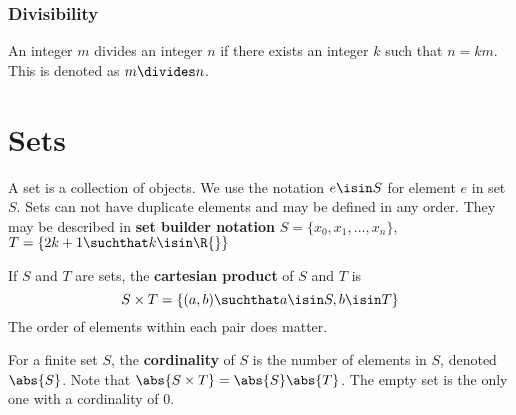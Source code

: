 \documentclass[12pt]{article}
\begin{document}


\subsubsection*{Divisibility}
 An integer $m$ divides an integer $n$ if there exists an integer $k$ such that $n = km$. This is denoted as $m \divides n$.



\section*{Sets}
A set is a collection of objects. We use the notation $e \isin S$ for element $e$ in set $S$. Sets can not have duplicate elements and may be defined in any order. They may be described in {\bf set builder notation} $S = \{ x_0, x_1, ... , x_n \}$, $T = \{ 2k + 1 \suchthat k \isin \R{} \}$

If $S$ and $T$ are sets, the {\bf cartesian product} of $S$ and $T$ is \[ S \times T = \{ (a,b) \suchthat a \isin S, b \isin T \} \] The order of elements within each pair does matter.

For a finite set $S$, the {\bf cordinality} of $S$ is the number of elements in $S$, denoted $\abs{S}$. Note that $\abs{S \times T} = \abs{S}\abs{T}$. The empty set is the only one with a cordinality of 0.
\end{document}
